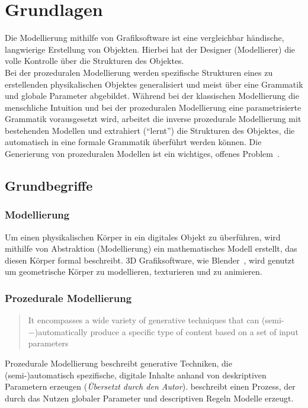 
\chapter{Grundlagen}

Die Modellierung mithilfe von Grafiksoftware ist eine vergleichbar händische, langwierige Erstellung von
Objekten.
Hierbei hat der Designer (Modellierer) die volle Kontrolle über die Strukturen des Objektes.\\
Bei der prozeduralen Modellierung werden spezifische Strukturen eines zu erstellenden physikalischen Objektes
generalisiert und meist über eine Grammatik und globale Parameter abgebildet.
Während bei der klassischen Modellierung die menschliche Intuition und bei der prozeduralen Modellierung eine
parametrisierte Grammatik vorausgesetzt wird, arbeitet die inverse prozedurale Modellierung mit bestehenden Modellen und
extrahiert ("`lernt"') die Strukturen des Objektes, die automatisch in eine formale Grammatik überführt werden können.
Die Generierung von prozeduralen Modellen ist ein wichtiges, offenes Problem~\cite{benes_2011}.

\section{Grundbegriffe}

\subsection*{Modellierung}
Um einen physikalischen Körper in ein digitales Objekt zu überführen, wird mithilfe von Abstraktion (Modellierung)
ein mathematisches Modell erstellt, das diesen Körper formal beschreibt.
3D Grafiksoftware, wie Blender~\cite{blender}, wird genutzt um geometrische Körper zu modellieren, texturieren
und zu animieren.
\subsection*{Prozedurale Modellierung}
\begin{quote}
    It encompasses a wide variety of generative techniques that
    can (semi-−)automatically produce a specific type of content based on a set of input
    parameters~\cite{smelik_2014}
\end{quote}
Prozedurale Modellierung beschreibt generative Techniken, die \\(semi-)automatisch spezifische, digitale
Inhalte anhand von deskriptiven Parametern erzeugen (\textit{Übersetzt durch den Autor}).
\citeauthor{smelik_2014} beschreibt einen Prozess, der durch das Nutzen globaler Parameter und descriptiven Regeln
Modelle erzeugt.
